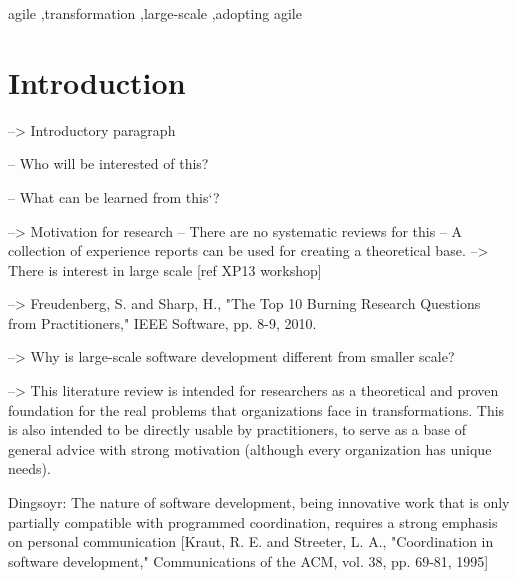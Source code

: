 \documentclass[preprint,authoryear,12pt]{elsarticle}
\begin{document}
\begin{frontmatter}
\begin{abstract}
\end{abstract}

\begin{keyword}

agile \sep transformation \sep large-scale \sep adopting agile

\end{keyword}

\end{frontmatter}




\section{Introduction}

--> Introductory paragraph

-- Who will be interested of this?

-- What can be learned from this`?

--> Motivation for research
-- There are no systematic reviews for this
-- A collection of experience reports can be used for creating a theoretical
   base.
--> There is interest in large scale [ref XP13 workshop]

--> Freudenberg, S. and Sharp, H., "The Top 10 Burning Research Questions from
    Practitioners," IEEE Software, pp. 8-9, 2010.

--> Why is large-scale software development different from smaller scale?

--> This literature review is intended for researchers as a theoretical
   and proven foundation for the real problems that organizations face in
   transformations.
   This is also intended to be directly usable by practitioners, to serve as a
   base of general advice with strong motivation (although every organization
   has unique needs).


Dingsoyr:
The nature of software development, being innovative work that is only partially
compatible with programmed coordination, requires a strong emphasis on personal
communication [Kraut, R. E. and Streeter, L. A., "Coordination in software
development," Communications of the ACM, vol. 38, pp. 69-81, 1995]
\end{document}
